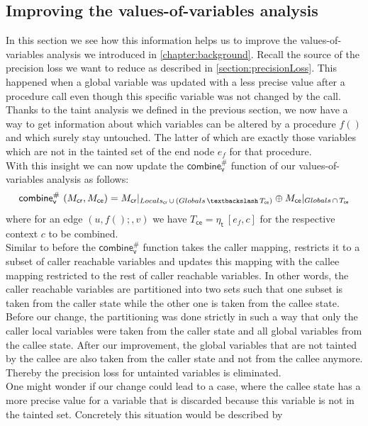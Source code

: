     \subsection{Improving the values-of-variables analysis}\label{section:formalImprove}
    In this section we see how this information helps us to improve the values-of-variables analysis we introduced in \autoref{chapter:background}. Recall the source of the precision loss we want to reduce as described in \autoref{section:precisionLoss}. This happened when a global variable was updated with a less precise value after a procedure call even though this specific variable was not changed by the call.\\
    Thanks to the taint analysis we defined in the previous section, we now have a way to get information about which variables can be altered by a procedure $f()$ and which surely stay untouched. The latter of which are exactly those variables which are not in the tainted set of the end node $e_f$ for that procedure.\\
    With this insight we can now update the $\textsf{combine}^{\#}_\textsf{v}$ function of our values-of-variables analysis as follows:
    \[
      \textsf{combine}^{\#}_\textsf{v}\ (M_\textsf{cr}, M_\textsf{ce}) = M_\textsf{cr}|_{Locals_\textsf{cr}\, \cup\, (Globals\, \textbackslash\, T_\textsf{ce})} \oplus M_\textsf{ce}|_{Globals\, \cap\, T_\textsf{ce}}
    \]
    where for an edge $(u, f();, v)$ we have $T_\textsf{ce} = \eta_\textsf{t}\ [e_f, c]$ for the respective context $c$ to be combined.\\
    Similar to before the $\textsf{combine}^{\#}_\textsf{v}$ function takes the caller mapping, restricts it to a subset of caller reachable variables and updates this mapping with the callee mapping restricted to the rest of caller reachable variables. In other words, the caller reachable variables are partitioned into two sets such that one subset is taken from the caller state while the other one is taken from the callee state. Before our change, the partitioning was done strictly in such a way that only the caller local variables were taken from the caller state and all global variables from the callee state. After our improvement, the global variables that are not tainted by the callee are also taken from the caller state and not from the callee anymore. Thereby the precision loss for untainted variables is eliminated.
    \\
    One might wonder if our change could lead to a case, where the callee state has a more precise value for a variable that is discarded because this variable is not in the tainted set. Concretely this situation would be described by 
